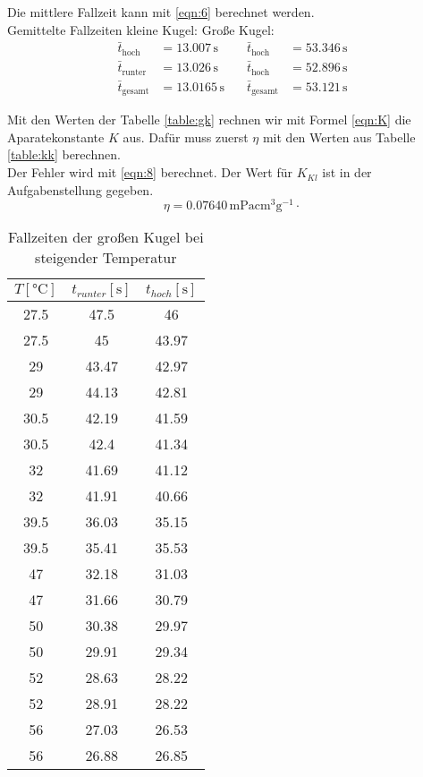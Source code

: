 Die mittlere Fallzeit kann mit \ref{eqn:6} berechnet werden.\\
Gemittelte Fallzeiten kleine Kugel: \qquad \qquad \qquad \qquad Große Kugel:
\begin{align}
  \bar{t}_{\text{hoch}} &= 13.007\,\unit{\second}  \quad &\bar{t}_{\text{hoch}} &= 53.346\,\unit{\second}\\
  \bar{t}_{\text{runter}} &= 13.026\,\unit{\second}  \quad &\bar{t}_{\text{hoch}} &= 52.896\,\unit{\second}\\
  \bar{t}_{\text{gesamt}} &= 13.0165\,\unit{\second}  \quad &\bar{t}_{\text{gesamt}} &= 53.121\,\unit{\second}
\end{align}

Mit den Werten der Tabelle \ref{table:gk} rechnen wir mit Formel \ref{eqn:K}
die Aparatekonstante $K$ aus. Dafür muss zuerst $η$ mit den Werten aus Tabelle \ref{table:kk} berechnen.\\
Der Fehler wird mit \ref{eqn:8} berechnet. Der Wert für $K_{Kl}$ ist in der Aufgabenstellung gegeben.\\
\begin{equation}
  η = 0.07640\,\mathrm{mPacm^3g^{-1}} \cdot 
\end{equation}



\begin{table}[!htp]
  \centering
  \begin{tabular}{|c|c|c|}
    \hline
    $T [\unit{\degreeCelsius}]$ & $t_{runter} [\unit{\second}]$ & $t_{hoch} [\unit{\second}]$\\
    \hline \hline
    27.5 & 47.5 & 46\\
    27.5 & 45 & 43.97\\
    29 & 43.47 & 42.97\\
    29 & 44.13 & 42.81\\
    30.5 & 42.19 & 41.59\\
    30.5 & 42.4 & 41.34\\
    32 & 41.69 & 41.12\\
    32 & 41.91 & 40.66\\
    39.5 & 36.03 & 35.15\\
    39.5 & 35.41 & 35.53\\
    47 & 32.18 & 31.03\\
    47 & 31.66 & 30.79\\
    50 & 30.38 & 29.97\\
    50 & 29.91 & 29.34\\
    52 & 28.63 & 28.22\\
    52 & 28.91 & 28.22\\
    56 & 27.03 & 26.53\\
    56 & 26.88 & 26.85\\
  \end{tabular}
  \label{tabellegkt}
  \caption{Fallzeiten der großen Kugel bei steigender Temperatur}
\end{table}


